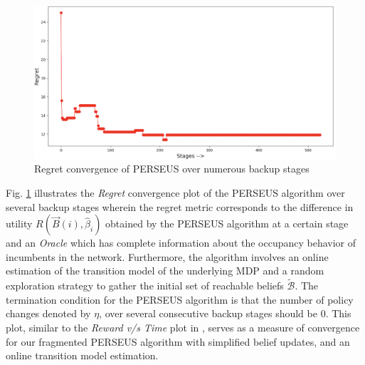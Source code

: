 \documentclass[10pt,twocolumn]{IEEEtran}
\begin{document}
\begin{figure}
    \centering
    \includegraphics[width=1.0\linewidth]{PerseusRegretConvergence.png}
    \caption{Regret convergence of PERSEUS over numerous backup stages}
    \label{fig:5}
\end{figure}

Fig. \ref{fig:5} illustrates the \emph{Regret} convergence plot of the PERSEUS algorithm over several backup stages wherein the regret metric corresponds to the difference in utility $R(\vec{B}(i), \hat{\beta}_{i})$ obtained by the PERSEUS algorithm at a certain stage and an \emph{Oracle} which has complete information about the occupancy behavior of incumbents in the network. Furthermore, the algorithm involves an online estimation of the transition model of the underlying MDP and a random exploration strategy to gather the initial set of reachable beliefs $\tilde{\mathcal{B}}$. The termination condition for the PERSEUS algorithm is that the number of policy changes denoted by $\eta$, over several consecutive backup stages should be $0$. This plot, similar to the \emph{Reward v/s Time} plot in \cite{DBLP:journals/corr/abs-1109-2145}, serves as a measure of convergence for our fragmented PERSEUS algorithm with simplified belief updates, and an online transition model estimation.
\end{document}
